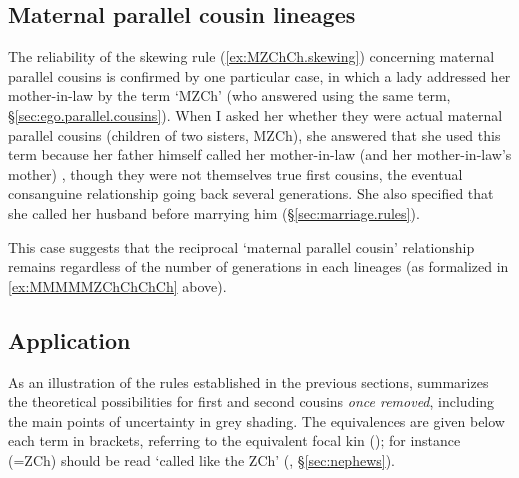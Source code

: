  \subsection{Maternal parallel cousin lineages} \label{sec:FMZCh.Tshendzin}
 The reliability of the skewing rule (\ref{ex:MZChCh.skewing}) concerning maternal parallel cousins is confirmed by one particular case, in which a lady addressed her mother-in-law by the term  `MZCh' (who answered using the same term, §\ref{sec:ego.parallel.cousins}). When I asked her whether they were actual maternal parallel cousins (children of two sisters, MZCh), she answered that she used this term because her father himself called her mother-in-law (and her mother-in-law's mother) , though they were not themselves true first cousins, the eventual consanguine relationship going back several generations. She also specified that she called her husband  before marrying him (§\ref{sec:marriage.rules}). 
 
This case suggests that the reciprocal  `maternal parallel cousin' relationship remains regardless of the number of generations in each lineages (as formalized in \ref {ex:MMMMMZChChChCh} above).

\subsection{Application} \label{sec:cousins.once.rmoved}
As an illustration of the rules established in the previous sections,  summarizes the theoretical possibilities for first and second cousins \textit{once removed}, including the main points of uncertainty in grey shading. The equivalences are given below each term in brackets, referring to the equivalent focal kin (); for instance (=ZCh) should be read `called like the ZCh' (, §\ref{sec:nephews}). 

